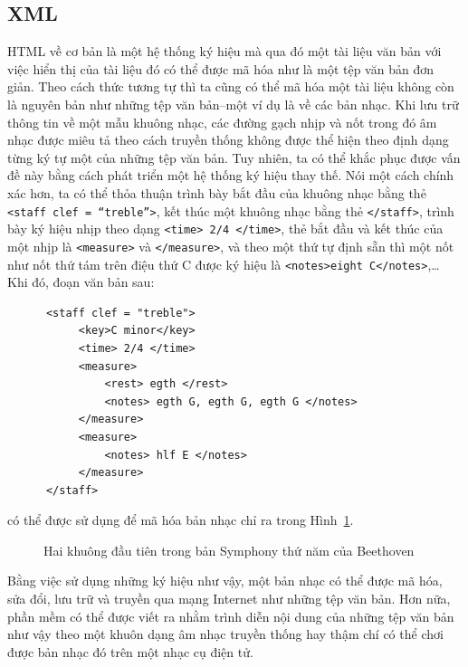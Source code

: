 \subsection*{XML}

HTML về cơ bản là một hệ thống ký hiệu mà qua đó một tài liệu văn bản với việc hiển thị
của tài liệu đó có thể được mã hóa như là một tệp văn bản đơn giản. Theo cách thức tương
tự thì ta cũng có thể mã hóa một tài liệu không còn là nguyên bản như những tệp văn
bản--một ví dụ là về các bản nhạc. Khi lưu trữ thông tin về một mẫu khuông nhạc, các đường
gạch nhịp và nốt trong đó âm nhạc được miêu tả theo cách truyền thống không được thể hiện
theo định dạng từng ký tự một của những tệp văn bản. Tuy nhiên, ta có thể khắc phục
được vấn đề này bằng cách phát triển một hệ thống ký hiệu thay thế. Nói một cách chính xác
hơn, ta có thể thỏa thuận trình bày bắt đầu của khuông nhạc bằng thẻ \texttt{<staff
  clef = ``treble''>}, kết thúc một khuông nhạc bằng thẻ \texttt{</staff>}, trình bày ký
hiệu nhịp theo dạng \texttt{<time> 2/4 </time>}, thẻ bắt đầu và kết thúc của một nhịp là
\texttt{<measure>} và \texttt{</measure>}, và theo một thứ tự định sẵn thì một nốt như nốt
thứ tám trên điệu thứ C được ký hiệu là \texttt{<notes>eight C</notes>},… Khi đó, đoạn văn
bản sau:
\begin{verbatim}
      <staff clef = "treble">
           <key>C minor</key>
           <time> 2/4 </time>
           <measure> 
               <rest> egth </rest> 
               <notes> egth G, egth G, egth G </notes>
           </measure>
           <measure> 
               <notes> hlf E </notes>
           </measure>
      </staff>
\end{verbatim}
có thể được sử dụng để mã hóa bản nhạc chỉ ra trong Hình~\ref{fig:fig4.11}.

\begin{figure}[bt] 
  \centering {}
  \caption{Hai khuông đầu tiên trong bản Symphony thứ năm của Beethoven}
  \label{fig:fig4.11}
\end{figure}


Bằng việc sử dụng những ký hiệu như vậy, một bản nhạc có thể được mã hóa, sửa đổi, lưu trữ
và truyền qua mạng Internet như những tệp văn bản. Hơn nữa, phần mềm có thể được viết ra
nhằm trình diễn nội dung của những tệp văn bản như vậy theo một khuôn dạng âm nhạc truyền
thống hay thậm chí có thể chơi được bản nhạc đó trên một nhạc cụ điện tử.

